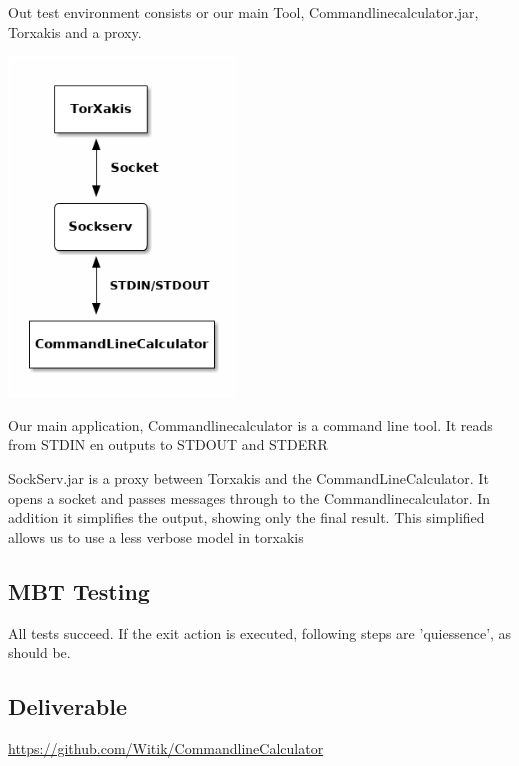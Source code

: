 \documentclass[11pt,a4paper]{article}
\begin{document}
Out test environment consists or our main Tool,
Commandlinecalculator.jar, Torxakis and a proxy.

\includegraphics[width=6cm]{overview.png}

Our main application, Commandlinecalculator is a command line tool. It
reads from STDIN en outputs to STDOUT and STDERR

SockServ.jar is a proxy between Torxakis and the
CommandLineCalculator. It opens a socket and passes messages through
to the Commandlinecalculator. In addition it simplifies the output,
showing only the final result. This simplified allows us to use a less
verbose model in torxakis

\subsection{MBT Testing}
All tests succeed. If the exit action is executed, following steps are 'quiessence', as should be.

\subsection{Deliverable}

\url{https://github.com/Witik/CommandlineCalculator}
\end{document}
